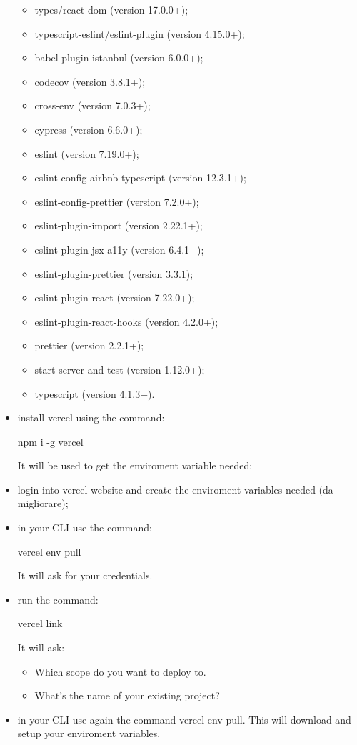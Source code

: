 \begin{itemize}
\begin{itemize}
\item types/react-dom (version 17.0.0+);
\item typescript-eslint/eslint-plugin (version 4.15.0+);
\item babel-plugin-istanbul (version 6.0.0+);
\item codecov (version 3.8.1+);
\item cross-env (version 7.0.3+);
\item cypress (version 6.6.0+);
\item eslint (version 7.19.0+);
\item eslint-config-airbnb-typescript (version 12.3.1+);
\item eslint-config-prettier (version 7.2.0+);
\item eslint-plugin-import (version 2.22.1+);
\item eslint-plugin-jsx-a11y (version 6.4.1+);
\item eslint-plugin-prettier (version 3.3.1);
\item eslint-plugin-react (version 7.22.0+);
\item eslint-plugin-react-hooks (version 4.2.0+);
\item prettier (version 2.2.1+);
\item start-server-and-test (version 1.12.0+);
\item typescript (version 4.1.3+).
\end{itemize}
\item install vercel using the command:\begin{center}npm i -g vercel\end{center}It will be used to get the enviroment variable needed;
\item login into vercel website and create the enviroment variables needed (da migliorare);
\item in your CLI use the command:\begin{center}vercel env pull\end{center}It will ask for your credentials.
\item run the command:\begin{center}vercel link\end{center}It will ask:
\begin{itemize}
\item Which scope do you want to deploy to.
\item What’s the name of your existing project? 
\end{itemize}
\item in your CLI use again the command vercel env pull. This will download and setup your enviroment variables.
\end{itemize}
